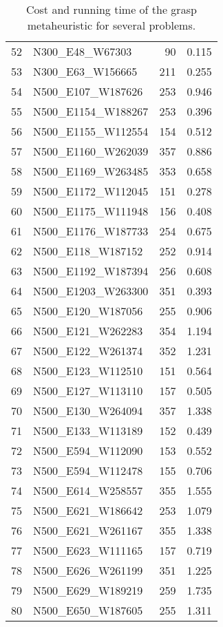\begin{table}
\begin{tabular}{llrr}
52 &     N300\_E48\_W67303 &    90 &             0.115 \\
53 &    N300\_E63\_W156665 &   211 &             0.255 \\
54 &   N500\_E107\_W187626 &   253 &             0.946 \\
55 &  N500\_E1154\_W188267 &   253 &             0.396 \\
56 &  N500\_E1155\_W112554 &   154 &             0.512 \\
57 &  N500\_E1160\_W262039 &   357 &             0.886 \\
58 &  N500\_E1169\_W263485 &   353 &             0.658 \\
59 &  N500\_E1172\_W112045 &   151 &             0.278 \\
60 &  N500\_E1175\_W111948 &   156 &             0.408 \\
61 &  N500\_E1176\_W187733 &   254 &             0.675 \\
62 &   N500\_E118\_W187152 &   252 &             0.914 \\
63 &  N500\_E1192\_W187394 &   256 &             0.608 \\
64 &  N500\_E1203\_W263300 &   351 &             0.393 \\
65 &   N500\_E120\_W187056 &   255 &             0.906 \\
66 &   N500\_E121\_W262283 &   354 &             1.194 \\
67 &   N500\_E122\_W261374 &   352 &             1.231 \\
68 &   N500\_E123\_W112510 &   151 &             0.564 \\
69 &   N500\_E127\_W113110 &   157 &             0.505 \\
70 &   N500\_E130\_W264094 &   357 &             1.338 \\
71 &   N500\_E133\_W113189 &   152 &             0.439 \\
72 &   N500\_E594\_W112090 &   153 &             0.552 \\
73 &   N500\_E594\_W112478 &   155 &             0.706 \\
74 &   N500\_E614\_W258557 &   355 &             1.555 \\
75 &   N500\_E621\_W186642 &   253 &             1.079 \\
76 &   N500\_E621\_W261167 &   355 &             1.338 \\
77 &   N500\_E623\_W111165 &   157 &             0.719 \\
78 &   N500\_E626\_W261199 &   351 &             1.225 \\
79 &   N500\_E629\_W189219 &   259 &             1.735 \\
80 &   N500\_E650\_W187605 &   255 &             1.311 \\
\bottomrule
\end{tabular}
\caption{Cost and running time of the grasp metaheuristic for several problems.}
\label{table:grasp-results}
\end{table}

